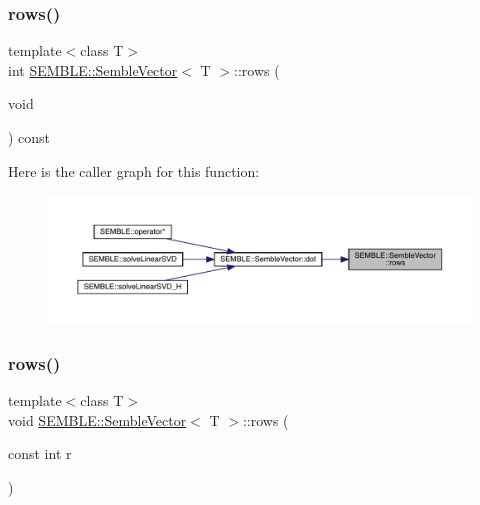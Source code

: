 \mbox{\label{structSEMBLE_1_1SembleVector_a2d225b0e49bb4b0c1c9fd3f9202a48e5}} 
\subsubsection{\texorpdfstring{rows()}{rows()}\hspace{0.1cm}{\footnotesize\ttfamily [2/4]}}
{\footnotesize\ttfamily template$<$class T$>$ \\
int \mbox{\hyperlink{structSEMBLE_1_1SembleVector}{S\+E\+M\+B\+L\+E\+::\+Semble\+Vector}}$<$ T $>$\+::rows (\begin{DoxyParamCaption}\item[{void}]{ }\end{DoxyParamCaption}) const\hspace{0.3cm}{\ttfamily [inline]}}

Here is the caller graph for this function\+:
\nopagebreak
\begin{figure}[H]
\begin{center}
\leavevmode
\includegraphics[width=350pt]{d9/d94/structSEMBLE_1_1SembleVector_a2d225b0e49bb4b0c1c9fd3f9202a48e5_icgraph}
\end{center}
\end{figure}
\mbox{\label{structSEMBLE_1_1SembleVector_ab123cb720f7df7ec85a288ea2e8c8338}} 
\subsubsection{\texorpdfstring{rows()}{rows()}\hspace{0.1cm}{\footnotesize\ttfamily [3/4]}}
{\footnotesize\ttfamily template$<$class T$>$ \\
void \mbox{\hyperlink{structSEMBLE_1_1SembleVector}{S\+E\+M\+B\+L\+E\+::\+Semble\+Vector}}$<$ T $>$\+::rows (\begin{DoxyParamCaption}\item[{const int}]{r }\end{DoxyParamCaption})\hspace{0.3cm}{\ttfamily [inline]}}

